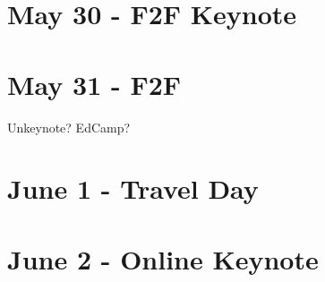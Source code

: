 \documentclass[
]{book}
\begin{document}
\hypertarget{may-30---f2f-keynote}{%
\chapter{May 30 - F2F Keynote}\label{may-30---f2f-keynote}}

\hypertarget{may-31---f2f}{%
\chapter{May 31 - F2F}\label{may-31---f2f}}

Unkeynote? EdCamp?

\hypertarget{june-1---travel-day}{%
\chapter{June 1 - Travel Day}\label{june-1---travel-day}}

\hypertarget{june-2---online-keynote}{%
\chapter{June 2 - Online Keynote}\label{june-2---online-keynote}}

  
\end{document}
